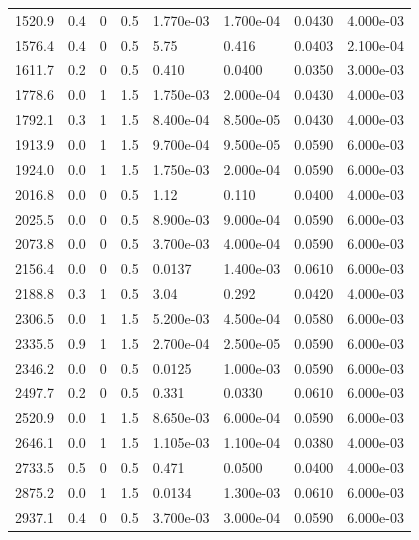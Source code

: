 \documentclass[preview]{standalone}
\begin{document}
{{\begin{tabular}{L{1.2cm}C{1.2cm} C{0.3cm}C{0.5cm} C{1.4cm}C{1.4cm} C{1.4cm}C{1.4cm}}
  1520.9  &   0.4  & 0     & 0.5 &  1.770e-03  & 1.700e-04  & 0.0430 &  4.000e-03   \\ 
  1576.4  &   0.4  & 0     & 0.5 &  5.75  & 0.416  & 0.0403 &  2.100e-04   \\ 
  1611.7  &   0.2  & 0     & 0.5 &  0.410  & 0.0400  & 0.0350 &  3.000e-03   \\ 
  1778.6  &   0.0  & 1     & 1.5 &  1.750e-03  & 2.000e-04  & 0.0430 &  4.000e-03   \\ 
  1792.1  &   0.3  & 1     & 1.5 &  8.400e-04  & 8.500e-05  & 0.0430 &  4.000e-03   \\ 
  1913.9  &   0.0  & 1     & 1.5 &  9.700e-04  & 9.500e-05  & 0.0590 &  6.000e-03   \\ 
  1924.0  &   0.0  & 1     & 1.5 &  1.750e-03  & 2.000e-04  & 0.0590 &  6.000e-03   \\ 
  2016.8  &   0.0  & 0     & 0.5 &  1.12  & 0.110  & 0.0400 &  4.000e-03   \\ 
  2025.5  &   0.0  & 0     & 0.5 &  8.900e-03  & 9.000e-04  & 0.0590 &  6.000e-03   \\ 
  2073.8  &   0.0  & 0     & 0.5 &  3.700e-03  & 4.000e-04  & 0.0590 &  6.000e-03   \\ 
  2156.4  &   0.0  & 0     & 0.5 &  0.0137  & 1.400e-03  & 0.0610 &  6.000e-03   \\ 
  2188.8  &   0.3  & 1     & 0.5 &  3.04  & 0.292  & 0.0420 &  4.000e-03   \\ 
  2306.5  &   0.0  & 1     & 1.5 &  5.200e-03  & 4.500e-04  & 0.0580 &  6.000e-03   \\ 
  2335.5  &   0.9  & 1     & 1.5 &  2.700e-04  & 2.500e-05  & 0.0590 &  6.000e-03   \\ 
  2346.2  &   0.0  & 0     & 0.5 &  0.0125  & 1.000e-03  & 0.0590 &  6.000e-03   \\ 
  2497.7  &   0.2  & 0     & 0.5 &  0.331  & 0.0330  & 0.0610 &  6.000e-03   \\ 
  2520.9  &   0.0  & 1     & 1.5 &  8.650e-03  & 6.000e-04  & 0.0590 &  6.000e-03   \\ 
  2646.1  &   0.0  & 1     & 1.5 &  1.105e-03  & 1.100e-04  & 0.0380 &  4.000e-03   \\ 
  2733.5  &   0.5  & 0     & 0.5 &  0.471  & 0.0500  & 0.0400 &  4.000e-03   \\ 
  2875.2  &   0.0  & 1     & 1.5 &  0.0134  & 1.300e-03  & 0.0610 &  6.000e-03   \\ 
  2937.1  &   0.4  & 0     & 0.5 &  3.700e-03  & 3.000e-04  & 0.0590 &  6.000e-03   \\ 

\end{tabular}}}
\end{document}
